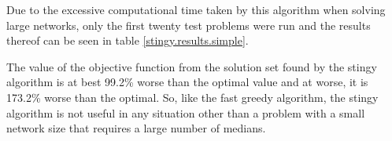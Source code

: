 \documentclass[11pt]{article}
\begin{document}
		Due to the excessive computational time taken by this algorithm when solving large networks, only the first twenty test problems were run and the results thereof can be seen in table \ref{stingy.results.simple}.
		
		The value of the objective function from the solution set found by the stingy algorithm is at best 99.2\% worse than the optimal value and at worse, it is 173.2\% worse than the optimal.  So, like the fast greedy algorithm, the stingy algorithm is not useful in any situation other than a problem with a small network size that requires a large number of medians.
		
		
		\begin{table}[]
			\centering
			\caption{Results of Stingy Algorithm (50 Runs)}
			\label{stingy.results.simple}
\end{table}
\end{document}
